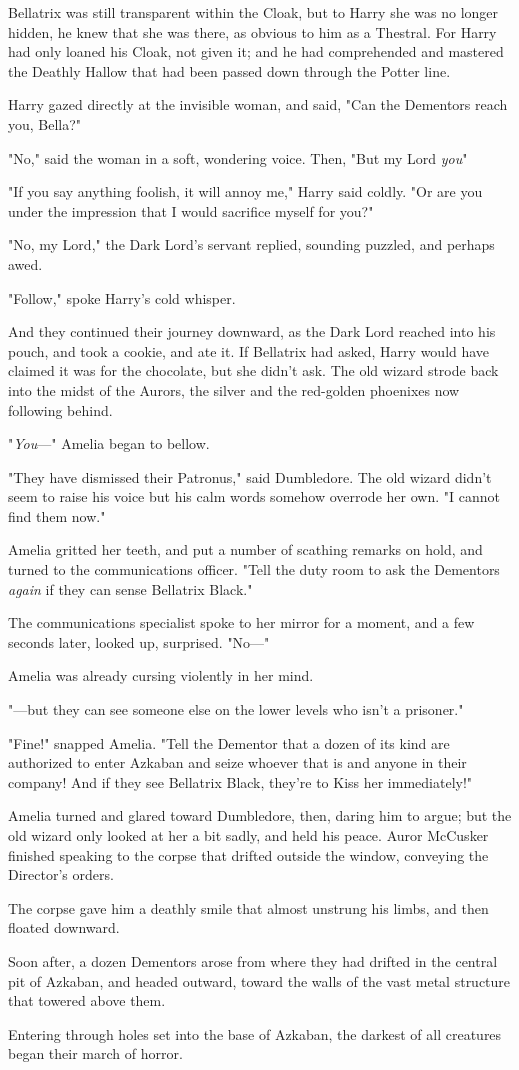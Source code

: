 Bellatrix was still transparent within the Cloak, but to Harry she was no
longer hidden, he knew that she was there, as obvious to him as a Thestral. For
Harry had only loaned his Cloak, not given it; and he had comprehended and
mastered the Deathly Hallow that had been passed down through the Potter line.

Harry gazed directly at the invisible woman, and said, "Can the Dementors reach
you, Bella?"

"No," said the woman in a soft, wondering voice. Then, "But my Lord{\el}
\emph{you}{\el}"

"If you say anything foolish, it will annoy me," Harry said coldly. "Or are you
under the impression that I would sacrifice myself for you?"

"No, my Lord," the Dark Lord's servant replied, sounding puzzled, and perhaps
awed.

"Follow," spoke Harry's cold whisper.

And they continued their journey downward, as the Dark Lord reached into his
pouch, and took a cookie, and ate it. If Bellatrix had asked, Harry would have
claimed it was for the chocolate, but she didn't ask.
\sbreak
The old wizard strode back into the midst of the Aurors, the silver and the
red-golden phoenixes now following behind.

"\emph{You}—" Amelia began to bellow.

"They have dismissed their Patronus," said Dumbledore. The old wizard didn't
seem to raise his voice but his calm words somehow overrode her own. "I cannot
find them now."

Amelia gritted her teeth, and put a number of scathing remarks on hold, and
turned to the communications officer. "Tell the duty room to ask the Dementors
\emph{again} if they can sense Bellatrix Black."

The communications specialist spoke to her mirror for a moment, and a few
seconds later, looked up, surprised. "No—"

Amelia was already cursing violently in her mind.

"—but they can see someone else on the lower levels who isn't a prisoner."

"Fine!" snapped Amelia. "Tell the Dementor that a dozen of its kind are
authorized to enter Azkaban and seize whoever that is and anyone in their
company! And if they see Bellatrix Black, they're to Kiss her immediately!"

Amelia turned and glared toward Dumbledore, then, daring him to argue; but the
old wizard only looked at her a bit sadly, and held his peace.
\sbreak
Auror McCusker finished speaking to the corpse that drifted outside the window,
conveying the Director's orders.

The corpse gave him a deathly smile that almost unstrung his limbs, and then
floated downward.

Soon after, a dozen Dementors arose from where they had drifted in the central
pit of Azkaban, and headed outward, toward the walls of the vast metal
structure that towered above them.

Entering through holes set into the base of Azkaban, the darkest of all
creatures began their march of horror.
